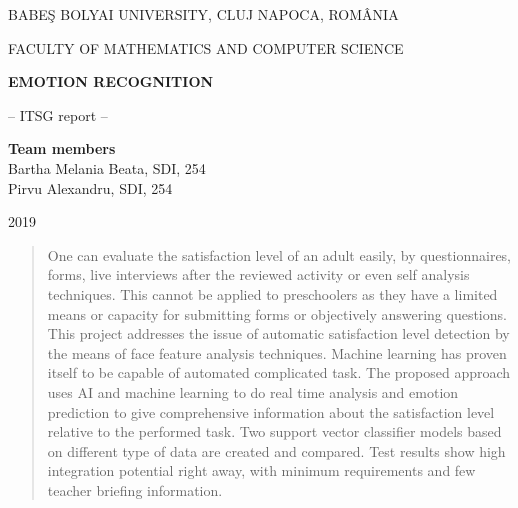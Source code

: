 \documentclass[runningheads,a4paper,11pt]{report}
\begin{document}
\begin{titlepage}
\sloppy
\begin{center}
BABE\c S BOLYAI UNIVERSITY, CLUJ NAPOCA, ROM\^ ANIA

FACULTY OF MATHEMATICS AND COMPUTER SCIENCE

\vspace{6cm}

\Huge \textbf{EMOTION RECOGNITION}

\vspace{1cm}

\normalsize -- ITSG report --

\end{center}


\vspace{5cm}

\begin{flushright}
\Large{\textbf{Team members}}\\
Bartha Melania Beata, SDI, 254\\
Pirvu Alexandru, SDI, 254
\end{flushright}

\vspace{4cm}

\begin{center}
2019
\end{center}

\end{titlepage}


\begin{abstract}
    One can evaluate the satisfaction level of an adult easily, by questionnaires, forms, live interviews after the reviewed activity or even self analysis techniques. This cannot be applied to preschoolers as they have a limited means or capacity for submitting forms or objectively answering questions. This project addresses the issue of automatic satisfaction level detection by the means of face feature analysis techniques. Machine learning has proven itself to be capable of automated complicated task. The proposed approach uses AI and machine learning to do real time analysis and emotion prediction to give comprehensive information about the satisfaction level relative to the performed task. Two support vector classifier models based on different type of data are created and compared. Test results show high integration potential right away, with minimum requirements and few teacher briefing information.
\end{abstract}
\end{document}
